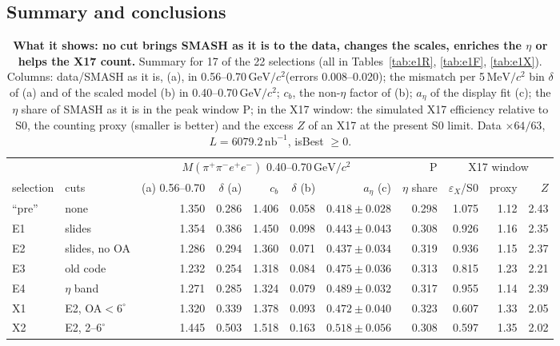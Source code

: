 \documentclass[11pt,a4paper]{article}
\newcommand{\Mfour}{\ensuremath{M(\pi^{+}\pi^{-}e^{+}e^{-})}\xspace}
\newcommand{\nbinv}{\ensuremath{\mathrm{nb}^{-1}}\xspace}
\newcommand{\GeVcc}{\ensuremath{\mathrm{GeV}/c^{2}}\xspace}
\newcommand{\MeVcc}{\ensuremath{\mathrm{MeV}/c^{2}}\xspace}
\newcommand{\cs}[1]{\textsf{#1}}%
\begin{document}
\clearpage%
\subsection{Summary and conclusions}
\label{sec:e1sum}

\begin{table}[tbp]
\centering
\caption{\textbf{What it shows: no cut brings SMASH as it is to the data, changes the scales, enriches the $\eta$ or helps the X17 count.}
Summary for 17 of the 22 selections (all in Tables~\ref{tab:e1R}, \ref{tab:e1F}, \ref{tab:e1X}). Columns: data/SMASH as it is, (a), in
0.56--0.70\,\GeVcc (errors 0.008--0.020); the mismatch per 5\,\MeVcc bin $\delta$ of (a) and of the scaled model (b) in 0.40--0.70\,\GeVcc; $c_b$,
the non-$\eta$ factor of (b); $a_\eta$ of the display fit (c); the $\eta$ share of SMASH as it is in the peak window P; in the X17 window: the
simulated X17 efficiency relative to S0, the counting proxy (smaller is better) and the excess $Z$ of an X17 at the present S0 limit. Data
$\times64/63$, $L=6079.2\,\nbinv$, isBest $\ge0$.}
\label{tab:e1sum}
\footnotesize
\setlength{\tabcolsep}{3pt}
\begin{tabular}{@{}l l r r r r r r r r r@{}}
\toprule
 & & \multicolumn{5}{c}{\Mfour 0.40--0.70\,\GeVcc} & P & \multicolumn{3}{c}{X17 window} \\
\cmidrule(lr){3-7}\cmidrule(lr){9-11}
selection & cuts & (a) 0.56--0.70 & $\delta$ (a) & $c_b$ & $\delta$ (b) & $a_\eta$ (c) & $\eta$ share & $\varepsilon_X$/S0 & proxy & $Z$ \\
\midrule
``pre'' & none & 1.350 & 0.286 & 1.406 & 0.058 & $0.418\pm0.028$ & 0.298 & 1.075 & 1.12 & 2.43 \\
\cs{E1} & slides & 1.354 & 0.386 & 1.450 & 0.098 & $0.443\pm0.043$ & 0.308 & 0.926 & 1.16 & 2.35 \\
\cs{E2} & slides, no OA & 1.286 & 0.294 & 1.360 & 0.071 & $0.437\pm0.034$ & 0.319 & 0.936 & 1.15 & 2.37 \\
\cs{E3} & old code & 1.232 & 0.254 & 1.318 & 0.084 & $0.475\pm0.036$ & 0.313 & 0.815 & 1.23 & 2.21 \\
\cs{E4} & $\eta$ band & 1.271 & 0.285 & 1.324 & 0.079 & $0.489\pm0.032$ & 0.317 & 0.955 & 1.14 & 2.39 \\
\cs{X1} & \cs{E2}, OA$<6^\circ$ & 1.320 & 0.339 & 1.378 & 0.093 & $0.472\pm0.040$ & 0.323 & 0.607 & 1.33 & 2.05 \\
\cs{X2} & \cs{E2}, 2--$6^\circ$ & 1.445 & 0.503 & 1.518 & 0.163 & $0.518\pm0.056$ & 0.308 & 0.597 & 1.35 & 2.02 \\

\end{tabular}
\end{table}
\end{document}
